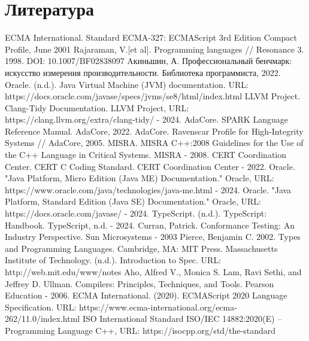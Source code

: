 \documentclass{mipt-thesis-bs}
\begin{document}
\chapter{Литература}
\begin{thebibliography}{99}
    ECMA International. Standard ECMA-327: ECMAScript 3rd Edition Compact Profile, June 2001
    Rajaraman, V.[et al]. Programming languages //
    Resonance 3. 1998. DOI: 10.1007/BF02838097
    Aкиньшин, А. Профессиональный бенчмарк: искусство измерения производительности. Библиотека программиста, 2022.
    Oracle. (n.d.). Java Virtual Machine (JVM) documentation.
    URL: https://docs.oracle.com/javase/specs/jvms/se8/html/index.html
    LLVM Project. Clang-Tidy Documentation. LLVM Project,
    URL: https://clang.llvm.org/extra/clang-tidy/ - 2024.
    AdaCore. SPARK Language Reference Manual. AdaCore, 2022.
    AdaCore. Ravenscar Profile for High-Integrity Systems // AdaCore, 2005.
    MISRA. MISRA C++:2008 Guidelines for the Use of the C++ Language in Critical Systems. MISRA - 2008.
    CERT Coordination Center. CERT C Coding Standard. CERT Coordination Center - 2022.
    Oracle. "Java Platform, Micro Edition (Java ME) Documentation." Oracle, URL: https://www.oracle.com/java/technologies/java-me.html - 2024.
    Oracle. "Java Platform, Standard Edition (Java SE) Documentation." Oracle, URL: https://docs.oracle.com/javase/ - 2024.
    TypeScript. (n.d.). TypeScript: Handbook. TypeScript, n.d. - 2024.
    Curran, Patrick. Conformance Testing: An Industry Perspective. Sun Microsystems - 2003
    Pierce, Benjamin C. 2002. Types and Programming Languages. Cambridge, MA: MIT Press.
    Massachusetts Institute of Technology. (n.d.). Introduction to Spec. URL: http://web.mit.edu/www/notes
    Aho, Alfred V., Monica S. Lam, Ravi Sethi, and Jeffrey D. Ullman. Compilers: Principles, Techniques, and Tools. Pearson Education - 2006.
    ECMA International. (2020). ECMAScript 2020 Language Specification.
    URL: https://www.ecma-international.org/ecma-262/11.0/index.html
    ISO International Standard ISO/IEC 14882:2020(E) – Programming Language C++,
     URL: https://isocpp.org/std/the-standard
\end{thebibliography}
\end{document}
